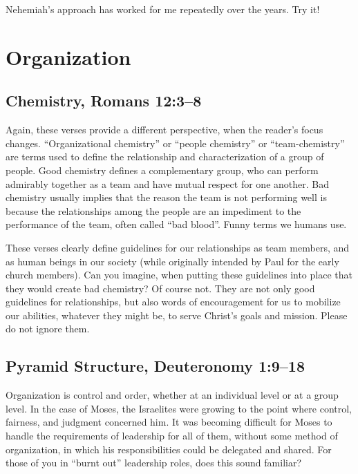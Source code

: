 \documentclass[12pt]{memoir}
\begin{document}
Nehemiah's approach has worked for me repeatedly over the years. Try it!

\section{Organization}

\subsection[Chemistry]{Chemistry, Romans 12:3--8}

Again, these verses provide a different perspective, when the reader's focus
changes. ``Organizational chemistry'' or ``people chemistry''
or ``team-chemistry'' are terms used to define the relationship
and characterization of a group of people. Good chemistry defines
a complementary group, who can perform admirably together as a team and have mutual respect for one another. Bad chemistry usually implies
that the reason the team is not performing well is because the relationships
among the people are an impediment to the performance of the team, often
called ``bad blood''. Funny terms we humans use.

These verses clearly define guidelines for our relationships as team
members, and as human beings in our society (while originally intended
by Paul for the early church members). Can you imagine, when putting
these guidelines into place that they would create bad chemistry?
Of course not. They are not only good guidelines for relationships,
but also words of encouragement for us to mobilize our abilities,
whatever they might be, to serve Christ's goals and mission. Please
do not ignore them.

\subsection[Pyramid Structure]{Pyramid Structure, Deuteronomy 1:9--18}

Organization is control and order, whether at an individual level
or at a group level. In the case of Moses, the Israelites were growing
to the point where control, fairness, and judgment concerned him. It
was becoming difficult for Moses to handle the requirements of leadership
for all of them, without some method of organization, in which his
responsibilities could be delegated and shared. For those of you in
``burnt out'' leadership roles, does this sound familiar?
\end{document}
